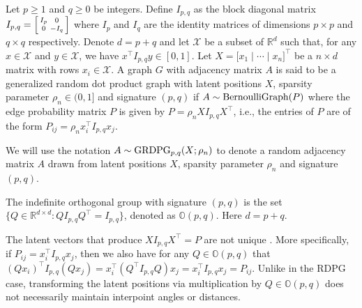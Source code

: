 \documentclass[12pt]{article}
\begin{document}
\begin{definition}
\label{grdpg}
Let $p \geq 1$ and $q \geq 0$ be integers. Define $I_{p,q}$ as the
block diagonal matrix $I_{p,q} = \Bigl[\begin{smallmatrix} I_{p} & 0
  \\ 0 & - I_{q} \end{smallmatrix} \Bigr]$ where $I_{p}$ and $I_{q}$
are the identity matrices of dimensions $p \times p$ and $q \times q$
respectively. Denote $d = p + q$ and let $\mathcal{X}$ be a subset of $\mathbb{R}^d$ such
that, for any $x \in \mathcal{X}$ and $y \in \mathcal{X}$, we have
$x^{\top} I_{p,q} y \in [0,1]$. 
Let $X = \bigl[x_1 \mid \cdots \mid x_n\bigr]^{\top}$ be
a $n \times d$ matrix with rows $x_i \in \mathcal{X}$. A graph $G$
with adjacency matrix $A$ is said to be a generalized random dot
product graph with latent positions $X$, sparsity parameter $\rho_n
\in (0,1]$
and signature $(p,q)$ if $A \sim \mathrm{BernoulliGraph}(P)$ where the edge probability
matrix $P$ is given
by $P = \rho_n X I_{p,q} X^{\top}$, i.e., the entries of $P$ are of
the form $P_{ij} = \rho_n x_i^{\top} I_{p,q} x_j.$
\end{definition}
We will use the notation \(A \sim \mathrm{GRDPG}_{p,q}(X;\rho_n)\) to denote a random
adjacency matrix \(A\) drawn from latent positions \(X\), sparsity
parameter $\rho_n$ and signature
\((p, q)\). 


\begin{definition}
  \label{def:indefinite}
The indefinite orthogonal group with signature $(p, q)$ is
the set $\{Q \in \mathbb{R}^{d \times d} \colon Q I_{p, q} Q^{\top} = I_{p, q}\}$,
denoted as $\mathbb{O}(p, q)$. Here $d = p + q$. 
\end{definition}

\begin{remark}
  \label{rem:non_identifiable}
The latent vectors that produce $X I_{p,q} X^\top = P$ are not unique
\citep{rubindelanchy2017statistical}.
More specifically, if $P_{ij} = x_i^\top I_{p, q} x_j$, 
then we also have for any $Q \in \mathbb{O}(p, q)$ that
$(Q x_i)^\top I_{p, q} (Q x_j) = x_i^\top (Q^\top I_{p, q} Q) x_j =
x_i^\top I_{p, q} x_j = P_{ij}$. Unlike in the RDPG case, transforming the latent positions via multiplication
by $Q \in \mathbb{O}(p, q)$ does not necessarily maintain interpoint angles or
distances.
\end{remark}
\end{document}

